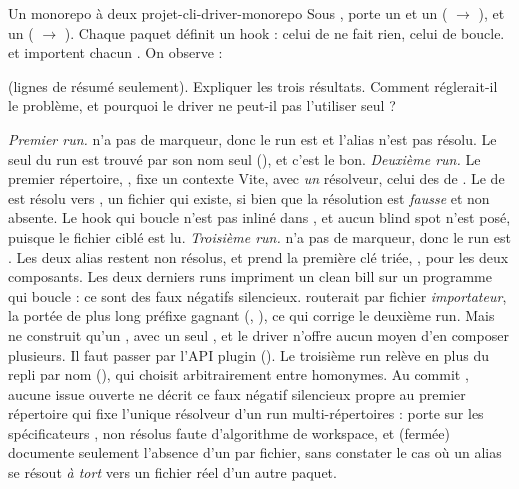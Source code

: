 \begin{exercice}{Un monorepo à deux }{projet-cli-driver-monorepo}
Sous ,  porte un  et un  ( $\to$ ), et  un  ( $\to$ ). Chaque paquet définit un hook  : celui de  ne fait rien, celui de  boucle.  et  importent chacun . On observe :
\noindent(lignes de résumé seulement). Expliquer les trois résultats. Comment  réglerait-il le problème, et pourquoi le driver ne peut-il pas l'utiliser seul ?
\end{exercice}
\begin{solution}
\emph{Premier run.}  n'a pas de marqueur, donc le run est  et l'alias n'est pas résolu. Le seul  du run est trouvé par son nom seul (), et c'est le bon. \emph{Deuxième run.} Le premier répertoire, , fixe un contexte Vite, avec \emph{un} résolveur, celui des  de . Le  de  est résolu vers , un fichier qui existe, si bien que la résolution est \emph{fausse} et non absente. Le hook qui boucle n'est pas inliné dans , et aucun blind spot n'est posé, puisque le fichier ciblé est lu. \emph{Troisième run.}  n'a pas de marqueur, donc le run est . Les deux alias restent non résolus, et  prend la première clé triée, , pour les deux composants. Les deux derniers runs impriment un clean bill sur un programme qui boucle : ce sont des faux négatifs silencieux.  routerait par fichier \emph{importateur}, la portée de plus long préfixe gagnant (, ), ce qui corrige le deuxième run. Mais  ne construit qu'un , avec un seul , et le driver n'offre aucun moyen d'en composer plusieurs. Il faut passer par l'API plugin (). Le troisième run relève en plus du repli par nom (), qui choisit arbitrairement entre homonymes. Au commit \snapshotCommit, aucune issue ouverte ne décrit ce faux négatif silencieux propre au premier répertoire qui fixe l'unique résolveur d'un run multi-répertoires :  porte sur les spécificateurs , non résolus faute d'algorithme de workspace, et  (fermée) documente seulement l'absence d'un  par fichier, sans constater le cas où un alias se résout \emph{à tort} vers un fichier réel d'un autre paquet.
\end{solution}
